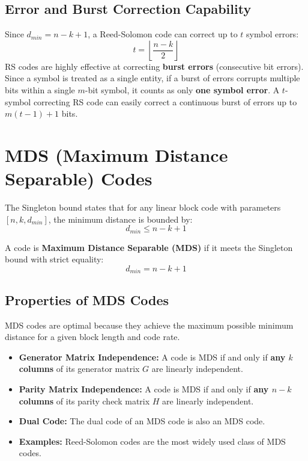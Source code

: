 \documentclass[12pt,a4paper]{article}
\begin{document}
\subsection{Error and Burst Correction Capability}
Since $d_{min} = n-k+1$, a Reed-Solomon code can correct up to $t$ symbol errors:
\[ t = \left\lfloor \frac{n-k}{2} \right\rfloor \]
RS codes are highly effective at correcting \textbf{burst errors} (consecutive bit errors). Since a symbol is treated as a single entity, if a burst of errors corrupts multiple bits within a single $m$-bit symbol, it counts as only \textbf{one symbol error}. A $t$-symbol correcting RS code can easily correct a continuous burst of errors up to $m(t-1) + 1$ bits.

\section{MDS (Maximum Distance Separable) Codes}

The Singleton bound states that for any linear block code with parameters $[n, k, d_{min}]$, the minimum distance is bounded by:
\[ d_{min} \le n - k + 1 \]

\begin{tcolorbox}[defbox, title={\textbf{MDS Code Definition}}]
A code is \textbf{Maximum Distance Separable (MDS)} if it meets the Singleton bound with strict equality:
\[ d_{min} = n - k + 1 \]
\end{tcolorbox}

\subsection{Properties of MDS Codes}
MDS codes are optimal because they achieve the maximum possible minimum distance for a given block length and code rate.
\begin{itemize}[leftmargin=*, itemsep=3pt]
  \item \textbf{Generator Matrix Independence:} A code is MDS if and only if \textbf{any $k$ columns} of its generator matrix $G$ are linearly independent.
  \item \textbf{Parity Matrix Independence:} A code is MDS if and only if \textbf{any $n-k$ columns} of its parity check matrix $H$ are linearly independent.
  \item \textbf{Dual Code:} The dual code of an MDS code is also an MDS code.
  \item \textbf{Examples:} Reed-Solomon codes are the most widely used class of MDS codes.
\end{itemize}
\end{document}
